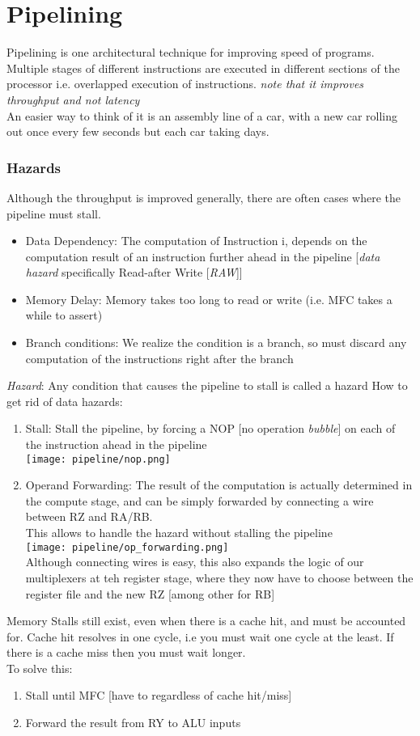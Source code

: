 \documentclass[10pt]{article}
\begin{document}
\section*{Pipelining}
Pipelining is one architectural technique for improving speed
of programs. Multiple stages of different instructions are executed in different sections of the processor i.e. overlapped execution of instructions. \textit{note that it improves throughput and not latency}\\
An easier way to think of it is an assembly line of a car, with a new car rolling out once every few seconds but each car taking days.
\subsubsection{Hazards}
Although the throughput is improved generally, there are often cases where the pipeline must stall.
\begin{itemize}
    \item Data Dependency: The computation of Instruction i, depends on the computation result of an instruction further ahead in the pipeline [\textit{data hazard} specifically Read-after Write [\textit{RAW}]]
    \item Memory Delay: Memory takes too long to read or write (i.e. MFC takes a while to assert)
    \item Branch conditions: We realize the condition is a branch, so must discard any computation of the instructions right after the branch
\end{itemize}
\textit{Hazard}: Any condition that causes the pipeline to stall is called a hazard
How to get rid of data hazards:
\begin{enumerate}
    \item Stall: Stall the pipeline, by forcing a NOP [no operation \textit{bubble}] on each of the instruction ahead in the pipeline\\
    \texttt{[image: pipeline/nop.png]}
    \item Operand Forwarding: The result of the computation is actually determined in the compute stage, and can be simply forwarded by connecting a wire between RZ and RA/RB. \\
    This allows to handle the hazard without stalling the pipeline\\
    \texttt{[image: pipeline/op\_forwarding.png]}\\
    Although connecting wires is easy, this also expands the logic of our multiplexers at teh register stage, where they now have to choose between the register file and the new RZ [among other for RB]
\end{enumerate}
Memory Stalls still exist, even when there is a cache hit, and must be accounted for.
Cache hit resolves in one cycle, i.e you must wait one cycle at the least. If there is a cache miss then you must wait longer.\\
To solve this:
\begin{enumerate}
    \item Stall until MFC [have to regardless of cache hit/miss]
    \item Forward the result from RY to ALU inputs
\end{enumerate}
\newpage
\end{document}
